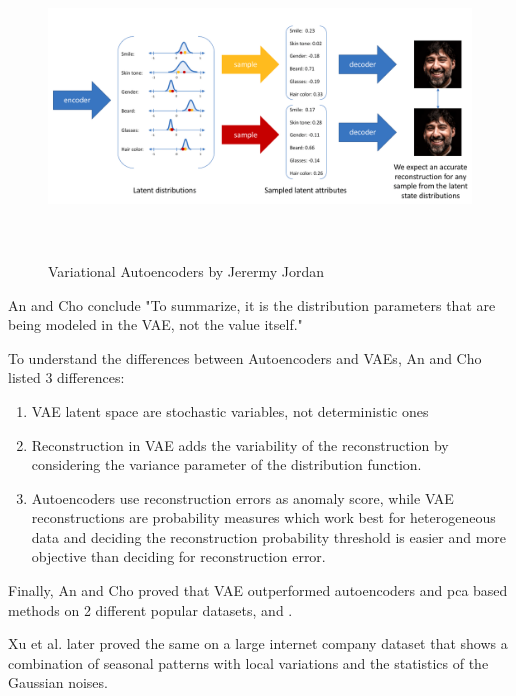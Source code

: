 \begin{figure}[ht]
    \hspace*{-1in}
    \centering
    \includegraphics[width = 17cm, height = 8cm]{images/vaes.png}
    \caption[Variational Autoencoders by Jerermy Jordan]{Variational Autoencoders by Jerermy Jordan \cite{jjordan}}
    \label{fig:vaes}
\end{figure}

An and Cho \cite{ancho} conclude "To summarize, it is the distribution parameters that are being modeled in the VAE, not the value itself."

To understand the differences between Autoencoders and VAEs, An and Cho \cite{ancho} listed 3 differences:

\begin{enumerate}
    \item VAE latent space are stochastic variables, not deterministic ones
    \item Reconstruction in VAE adds the variability of the reconstruction by considering the variance parameter of the distribution function.
    \item Autoencoders use reconstruction errors as anomaly score, while VAE reconstructions are probability measures which work best for heterogeneous data and deciding the reconstruction probability threshold is easier and more objective than deciding for reconstruction error.
\end{enumerate}

Finally, An and Cho \cite{ancho} proved that VAE outperformed autoencoders and \acrshort{pca} based methods on 2 different popular datasets,  \cite{mnist} and  \cite{kdd}.

Xu et al. later proved the same on a large internet company dataset that shows a combination of seasonal patterns with local variations and the statistics of the Gaussian noises.

